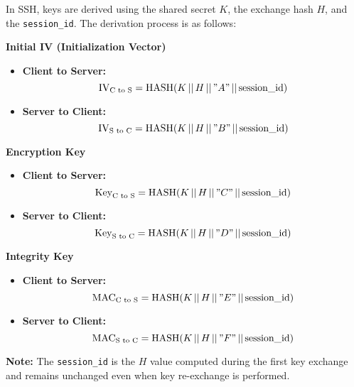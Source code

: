 In SSH, keys are derived using the shared secret \( K \), the exchange hash \( H \), and the \texttt{session\_id}. The derivation process is as follows:

\textbf{Initial IV (Initialization Vector)}
\begin{itemize}[itemsep=0pt]
    \item \textbf{Client to Server:} 
    \[
    \text{IV}_{\text{C to S}} = \text{HASH}( K \,||\, H \,||\, "A" \,||\, \text{session\_id} )
    \]
    \item \textbf{Server to Client:}
    \[
    \text{IV}_{\text{S to C}} = \text{HASH}( K \,||\, H \,||\, "B" \,||\, \text{session\_id} )
    \]
\end{itemize}

\textbf{Encryption Key}
\begin{itemize}[itemsep=0pt]
    \item \textbf{Client to Server:}
    \[
    \text{Key}_{\text{C to S}} = \text{HASH}( K \,||\, H \,||\, "C" \,||\, \text{session\_id} )
    \]
    \item \textbf{Server to Client:}
    \[
    \text{Key}_{\text{S to C}} = \text{HASH}( K \,||\, H \,||\, "D" \,||\, \text{session\_id} )
    \]
\end{itemize}

\textbf{Integrity Key}
\begin{itemize}[itemsep=0pt]
    \item \textbf{Client to Server:}
    \[
    \text{MAC}_{\text{C to S}} = \text{HASH}( K \,||\, H \,||\, "E" \,||\, \text{session\_id} )
    \]
    \item \textbf{Server to Client:}
    \[
    \text{MAC}_{\text{S to C}} = \text{HASH}( K \,||\, H \,||\, "F" \,||\, \text{session\_id} )
    \]
\end{itemize}

\textbf{Note:} The \texttt{session\_id} is the \( H \) value computed during the first key exchange and remains unchanged even when key re-exchange is performed.
